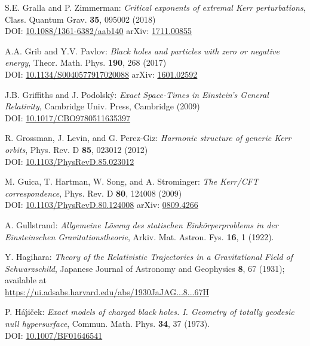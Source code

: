 \begin{thebibliography}{123}
S.E. Gralla and P. Zimmerman:
{\em Critical exponents of extremal Kerr perturbations},
Class. Quantum Grav. {\bf 35}, 095002 (2018)\\
DOI: \href{https://doi.org/10.1088/1361-6382/aab140}{10.1088/1361-6382/aab140}\hfill
arXiv: \href{https://arxiv.org/abs/1711.00855}{1711.00855}

A.A. Grib and Y.V. Pavlov:
{\em Black holes and particles with zero or negative energy},
Theor. Math. Phys. {\bf 190}, 268 (2017)\\
DOI: \href{https://doi.org/10.1134/S0040577917020088}{10.1134/S0040577917020088}\hfill
arXiv: \href{https://arxiv.org/abs/1601.02592}{1601.02592}

J.B. Griffiths and J. Podolský:
{\em Exact Space-Times in Einstein's General Relativity},
Cambridge Univ. Press, Cambridge (2009)\\
DOI: \href{https://doi.org/10.1017/CBO9780511635397}{10.1017/CBO9780511635397}

R. Grossman, J. Levin, and G. Perez-Giz:
{\em Harmonic structure of generic Kerr orbits},
Phys. Rev. D {\bf 85}, 023012 (2012)\\
DOI: \href{https://doi.org/10.1103/PhysRevD.85.023012}{10.1103/PhysRevD.85.023012}

M. Guica, T. Hartman, W. Song, and A. Strominger:
{\em The Kerr/CFT correspondence},
Phys. Rev. D {\bf 80}, 124008 (2009)\\
DOI: \href{https://doi.org/10.1103/PhysRevD.80.124008}{10.1103/PhysRevD.80.124008}\hfill
arXiv: \href{https://arxiv.org/abs/0809.4266}{0809.4266}

A. Gullstrand:
\emph{Allgemeine Lösung des statischen Einkörperproblems in der Einsteinschen Gravitationstheorie},
Arkiv. Mat. Astron. Fys. {\bf 16}, 1 (1922).

Y. Hagihara:
\emph{Theory of the Relativistic Trajectories in a Gravitational Field of Schwarzschild},
Japanese Journal of Astronomy and Geophysics {\bf 8}, 67 (1931);
available at \\
\url{https://ui.adsabs.harvard.edu/abs/1930JaJAG...8...67H}

P. H\'a\'\j i\v{c}ek: {\em Exact models of charged black holes. I. Geometry
of totally geodesic null hypersurface},
Commun. Math. Phys. {\bf 34}, 37 (1973). \\
DOI: \href{https://doi.org/10.1007/BF01646541}{10.1007/BF01646541}


\end{thebibliography}
